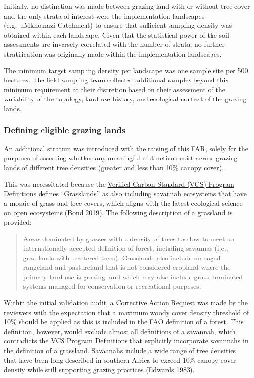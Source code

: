\documentclass[
  letterpaper,
  DIV=11,
  numbers=noendperiod]{scrartcl}
\begin{document}
Initially, no distinction was made between grazing land with or without
tree cover and the only strata of interest were the implementation
landscapes (e.g.~uMkhomazi Catchment) to ensure that sufficient sampling
density was obtained within each landscape. Given that the statistical
power of the soil assessments are inversely correlated with the number
of strata, no further stratification was originally made within the
implementation landscapes.

The minimum target sampling density per landscape was one sample site
per 500 hectares. The field sampling team collected additional samples
beyond this minimum requirement at their discretion based on their
assessment of the variability of the topology, land use history, and
ecological context of the grazing lands.

\subsubsection{Defining eligible grazing
lands}\label{defining-eligible-grazing-lands}

An additional stratum was introduced with the raising of this FAR,
solely for the purposes of assessing whether any meaningful distinctions
exist across grazing lands of different tree densities (greater and less
than 10\% canopy cover).

This was necessitated because the
\href{https://verra.org/wp-content/uploads/2022/12/vcs-program-definitions-v4.3-final.pdf}{Verified
Carbon Standard (VCS) Program Definitions} defines ``Grasslands'' as
also including savannah ecosystems that have a mosaic of grass and tree
covers, which aligns with the latest ecological science on open
ecosystems (Bond 2019). The following description of a grassland is
provided:

\begin{quote}
Areas dominated by grasses with a density of trees too low to meet an
internationally accepted definition of forest, including savannas (i.e.,
grasslands with scattered trees). Grasslands also include managed
rangeland and pastureland that is not considered cropland where the
primary land use is grazing, and which may also include grass-dominated
systems managed for conservation or recreational purposes.
\end{quote}

Within the initial validation audit, a Corrective Action Request was
made by the reviewers with the expectation that a maximum woody cover
density threshold of 10\% should be applied as this is included in the
\href{https://www.fao.org/3/I8661EN/i8661en.pdf}{FAO definition} of a
forest. This definition, however, would exclude almost all definitions
of a savannah, which contradicts the
\href{https://verra.org/wp-content/uploads/2022/12/vcs-program-definitions-v4.3-final.pdf}{VCS
Program Definitions} that explicitly incorporate savannahs in the
definition of a grassland. Savannahs include a wide range of tree
densities that have been long described in southern Africa to exceed
10\% canopy cover density while still supporting grazing practices
(Edwards 1983).
\end{document}
